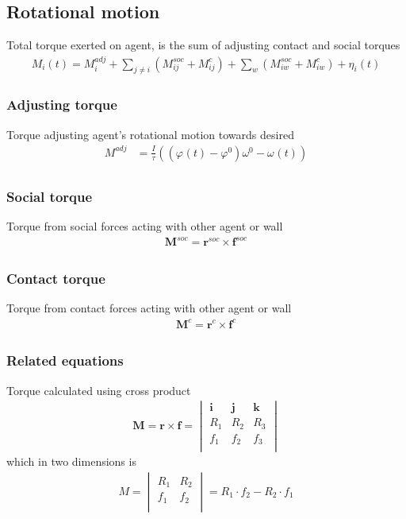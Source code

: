 \subsection{Rotational motion}
Total torque exerted on agent, is the sum of adjusting contact and social torques
\begin{align}
M_{i}(t) = M_{i}^{adj} + \sum_{j\neq i}^{} \left(M_{ij}^{soc} + M_{ij}^{c}\right) + \sum_{w}^{} \left(M_{iw}^{soc} + M_{iw}^{c}\right) + \eta_{i}(t)
\end{align}


\subsubsection{Adjusting torque}
Torque adjusting agent's rotational motion towards desired
\begin{align}
M_{}^{adj} &= \frac{I_{}}{\tau_{}} \left((\varphi_{}(t) - \varphi_{}^{0}) \omega_{}^{0} - \omega_{}(t)\right) \\
\end{align}

\subsubsection{Social torque}
Torque from social forces acting with other agent or wall
\begin{align}
\mathbf{M}_{}^{soc} = \mathbf{r}_{}^{soc} \times \mathbf{f}_{}^{soc}
\end{align}

\subsubsection{Contact torque}
Torque from contact forces acting with other agent or wall
\begin{align}
\mathbf{M}_{}^{c} = \mathbf{r}_{}^{c} \times \mathbf{f}_{}^{c}
\end{align}

\subsubsection{Related equations}
Torque calculated using cross product
\begin{align}
\mathbf{M} = \mathbf{r} \times \mathbf{f} =  \begin{vmatrix} \mathbf{i} & \mathbf{j} & \mathbf{k} \\ R_{1} & R_{2} & R_{3} \\ f_{1} & f_{2} & f_{3} \\ \end{vmatrix} 
\end{align}
which in two dimensions is
\begin{align}
M = \begin{vmatrix} R_{1} & R_{2} \\ f_{1} & f_{2} \\ \end{vmatrix} = R_{1} \cdot f_{2} - R_{2} \cdot f_{1}
\end{align}